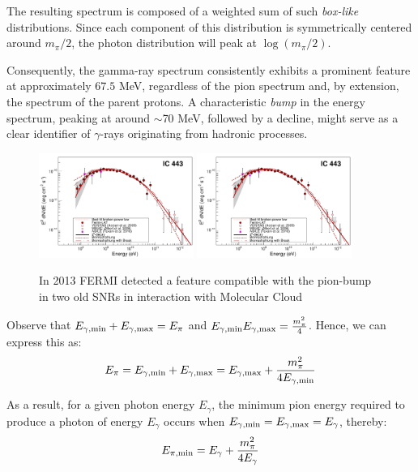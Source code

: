 The resulting spectrum is composed of a weighted sum of such \emph{box-like} distributions. Since each component of this distribution is symmetrically centered around \( m_\pi / 2 \), the photon distribution will peak at \( \log(m_\pi / 2) \).

Consequently, the gamma-ray spectrum consistently exhibits a prominent feature at approximately \( 67.5 \) MeV, regardless of the pion spectrum and, by extension, the spectrum of the parent protons.
%
A characteristic \emph{bump} in the energy spectrum, peaking at around $\sim$70 MeV, followed by a decline, might serve as a clear identifier of $\gamma$-rays originating from hadronic processes.

\begin{figure}[!t]
\centering
\includegraphics[width=0.45\textwidth]{figures/1231160fig2a.pdf}
\includegraphics[width=0.45\textwidth]{figures/1231160fig2a.pdf}
\caption{In 2013 FERMI detected a feature compatible with the pion-bump in two old SNRs in interaction with Molecular Cloud~\cite{Ackermann2013sci}}
\end{figure}

Observe that \( E_{\rm \gamma, min} + E_{\rm \gamma, max} = E_\pi \) and \( E_{\rm \gamma, min} E_{\rm \gamma, max} = \frac{m_\pi^2}{4} \). Hence, we can express this as:
%
\[
E_\pi = E_{\rm \gamma, min} + E_{\rm \gamma, max} = E_{\rm \gamma, max} + \frac{m_\pi^2}{4E_{\rm \gamma, min}}
\]

As a result, for a given photon energy \( E_\gamma \), the minimum pion energy required to produce a photon of energy \( E_\gamma \) occurs when \( E_{\rm \gamma,min} = E_{\rm \gamma,max} = E_\gamma \), thereby:
%
\[
E_{\rm \pi, min} = E_\gamma + \frac{m_\pi^2}{4 E_\gamma}
\]

